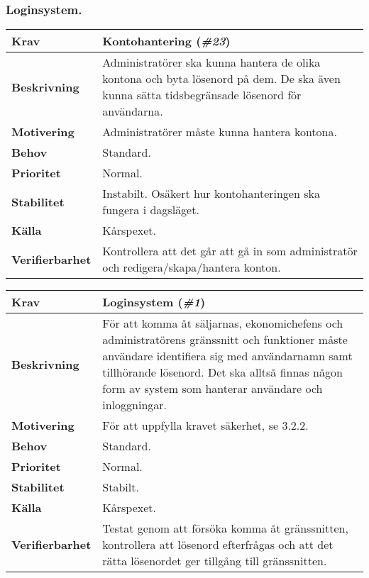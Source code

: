 \documentclass[a4paper, twoside, 11pt, titlepage]{article}
\begin{document}
		\subsubsection{Loginsystem.}


		\begin{tabular} { p{2.6cm} p{12.5cm} }
			\hline
			\sffamily\textbf{Krav} & Kontohantering (\emph{\#23})  \\
			\hline
			\sffamily\textbf{Beskrivning} & Administratörer ska kunna hantera de olika kontona och byta lösenord på dem. De ska även kunna sätta tidsbegränsade lösenord för användarna.  \\
			\hline
			\sffamily\textbf{Motivering} & Administratörer måste kunna hantera kontona.  \\
			\hline
			\sffamily\textbf{Behov} & Standard.  \\
			\hline
			\sffamily\textbf{Prioritet} & Normal.  \\
			\hline
			\sffamily\textbf{Stabilitet} & Instabilt. Osäkert hur kontohanteringen ska fungera i dagsläget.  \\
			\hline
			\sffamily\textbf{Källa} & Kårspexet.  \\
			\hline
			\sffamily\textbf{Verifierbarhet} & Kontrollera att det går att gå in som administratör och redigera/skapa/hantera konton.  \\
			\hline
		\end{tabular}
		\vspace{6mm}

		\begin{tabular} { p{2.6cm} p{12.5cm} }
			\hline
			\sffamily\textbf{Krav} & Loginsystem (\emph{\#1})  \\
			\hline
			\sffamily\textbf{Beskrivning} & För att komma åt säljarnas, ekonomichefens och administratörens gränssnitt och funktioner måste användare identifiera sig med användarnamn samt tillhörande lösenord. Det ska alltså finnas någon form av system som hanterar användare och inloggningar.  \\
			\hline
			\sffamily\textbf{Motivering} & För att uppfylla kravet säkerhet, se 3.2.2.  \\
			\hline
			\sffamily\textbf{Behov} & Standard.  \\
			\hline
			\sffamily\textbf{Prioritet} & Normal.  \\
			\hline
			\sffamily\textbf{Stabilitet} & Stabilt.  \\
			\hline
			\sffamily\textbf{Källa} & Kårspexet.  \\
			\hline
			\sffamily\textbf{Verifierbarhet} & Testat genom att försöka komma åt gränssnitten, kontrollera att lösenord efterfrågas och att det rätta lösenordet ger tillgång till gränssnitten.  \\
			\hline
		\end{tabular}
		\vspace{6mm}
\end{document}
